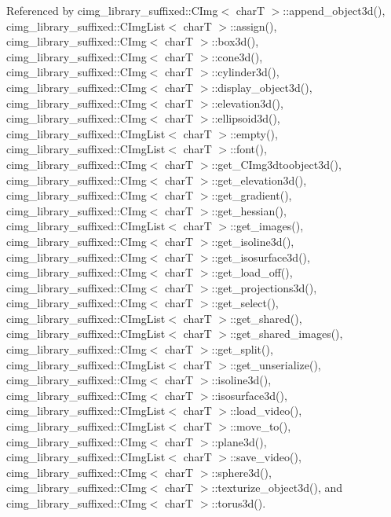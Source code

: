 Referenced by cimg\+\_\+library\+\_\+suffixed\+::\+C\+Img$<$ char\+T $>$\+::append\+\_\+object3d(), cimg\+\_\+library\+\_\+suffixed\+::\+C\+Img\+List$<$ char\+T $>$\+::assign(), cimg\+\_\+library\+\_\+suffixed\+::\+C\+Img$<$ char\+T $>$\+::box3d(), cimg\+\_\+library\+\_\+suffixed\+::\+C\+Img$<$ char\+T $>$\+::cone3d(), cimg\+\_\+library\+\_\+suffixed\+::\+C\+Img$<$ char\+T $>$\+::cylinder3d(), cimg\+\_\+library\+\_\+suffixed\+::\+C\+Img$<$ char\+T $>$\+::display\+\_\+object3d(), cimg\+\_\+library\+\_\+suffixed\+::\+C\+Img$<$ char\+T $>$\+::elevation3d(), cimg\+\_\+library\+\_\+suffixed\+::\+C\+Img$<$ char\+T $>$\+::ellipsoid3d(), cimg\+\_\+library\+\_\+suffixed\+::\+C\+Img\+List$<$ char\+T $>$\+::empty(), cimg\+\_\+library\+\_\+suffixed\+::\+C\+Img\+List$<$ char\+T $>$\+::font(), cimg\+\_\+library\+\_\+suffixed\+::\+C\+Img$<$ char\+T $>$\+::get\+\_\+\+C\+Img3dtoobject3d(), cimg\+\_\+library\+\_\+suffixed\+::\+C\+Img$<$ char\+T $>$\+::get\+\_\+elevation3d(), cimg\+\_\+library\+\_\+suffixed\+::\+C\+Img$<$ char\+T $>$\+::get\+\_\+gradient(), cimg\+\_\+library\+\_\+suffixed\+::\+C\+Img$<$ char\+T $>$\+::get\+\_\+hessian(), cimg\+\_\+library\+\_\+suffixed\+::\+C\+Img\+List$<$ char\+T $>$\+::get\+\_\+images(), cimg\+\_\+library\+\_\+suffixed\+::\+C\+Img$<$ char\+T $>$\+::get\+\_\+isoline3d(), cimg\+\_\+library\+\_\+suffixed\+::\+C\+Img$<$ char\+T $>$\+::get\+\_\+isosurface3d(), cimg\+\_\+library\+\_\+suffixed\+::\+C\+Img$<$ char\+T $>$\+::get\+\_\+load\+\_\+off(), cimg\+\_\+library\+\_\+suffixed\+::\+C\+Img$<$ char\+T $>$\+::get\+\_\+projections3d(), cimg\+\_\+library\+\_\+suffixed\+::\+C\+Img$<$ char\+T $>$\+::get\+\_\+select(), cimg\+\_\+library\+\_\+suffixed\+::\+C\+Img\+List$<$ char\+T $>$\+::get\+\_\+shared(), cimg\+\_\+library\+\_\+suffixed\+::\+C\+Img\+List$<$ char\+T $>$\+::get\+\_\+shared\+\_\+images(), cimg\+\_\+library\+\_\+suffixed\+::\+C\+Img$<$ char\+T $>$\+::get\+\_\+split(), cimg\+\_\+library\+\_\+suffixed\+::\+C\+Img\+List$<$ char\+T $>$\+::get\+\_\+unserialize(), cimg\+\_\+library\+\_\+suffixed\+::\+C\+Img$<$ char\+T $>$\+::isoline3d(), cimg\+\_\+library\+\_\+suffixed\+::\+C\+Img$<$ char\+T $>$\+::isosurface3d(), cimg\+\_\+library\+\_\+suffixed\+::\+C\+Img\+List$<$ char\+T $>$\+::load\+\_\+video(), cimg\+\_\+library\+\_\+suffixed\+::\+C\+Img\+List$<$ char\+T $>$\+::move\+\_\+to(), cimg\+\_\+library\+\_\+suffixed\+::\+C\+Img$<$ char\+T $>$\+::plane3d(), cimg\+\_\+library\+\_\+suffixed\+::\+C\+Img\+List$<$ char\+T $>$\+::save\+\_\+video(), cimg\+\_\+library\+\_\+suffixed\+::\+C\+Img$<$ char\+T $>$\+::sphere3d(), cimg\+\_\+library\+\_\+suffixed\+::\+C\+Img$<$ char\+T $>$\+::texturize\+\_\+object3d(), and cimg\+\_\+library\+\_\+suffixed\+::\+C\+Img$<$ char\+T $>$\+::torus3d().

